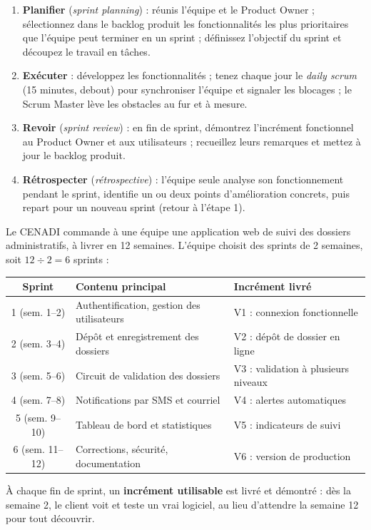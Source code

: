 \documentclass[11pt]{article}
\begin{document}
\begin{methode}
\begin{enumerate}
  \item \textbf{Planifier} (\emph{sprint planning}) : réunis l'équipe et le Product Owner ; sélectionnez dans le backlog produit les fonctionnalités les plus prioritaires que l'équipe peut terminer en un sprint ; définissez l'objectif du sprint et découpez le travail en tâches.
  \item \textbf{Exécuter} : développez les fonctionnalités ; tenez chaque jour le \emph{daily scrum} (15 minutes, debout) pour synchroniser l'équipe et signaler les blocages ; le Scrum Master lève les obstacles au fur et à mesure.
  \item \textbf{Revoir} (\emph{sprint review}) : en fin de sprint, démontrez l'incrément fonctionnel au Product Owner et aux utilisateurs ; recueillez leurs remarques et mettez à jour le backlog produit.
  \item \textbf{Rétrospecter} (\emph{rétrospective}) : l'équipe seule analyse son fonctionnement pendant le sprint, identifie un ou deux points d'amélioration concrets, puis repart pour un nouveau sprint (retour à l'étape 1).
\end{enumerate}
\end{methode}

\begin{exemplebox}
Le CENADI commande à une équipe une application web de suivi des dossiers administratifs, à livrer en 12 semaines. L'équipe choisit des sprints de 2 semaines, soit $12 \div 2 = 6$ sprints :
\begin{center}
\begin{tabularx}{\linewidth}{|c|X|l|}
\hline
\rowcolor{popblueL} \textbf{Sprint} & \textbf{Contenu principal} & \textbf{Incrément livré} \\
\hline
1 (sem. 1--2) & Authentification, gestion des utilisateurs & V1 : connexion fonctionnelle \\
\hline
2 (sem. 3--4) & Dépôt et enregistrement des dossiers & V2 : dépôt de dossier en ligne \\
\hline
3 (sem. 5--6) & Circuit de validation des dossiers & V3 : validation à plusieurs niveaux \\
\hline
4 (sem. 7--8) & Notifications par SMS et courriel & V4 : alertes automatiques \\
\hline
5 (sem. 9--10) & Tableau de bord et statistiques & V5 : indicateurs de suivi \\
\hline
6 (sem. 11--12) & Corrections, sécurité, documentation & V6 : version de production \\
\hline
\end{tabularx}
\end{center}
À chaque fin de sprint, un \textbf{incrément utilisable} est livré et démontré : dès la semaine 2, le client voit et teste un vrai logiciel, au lieu d'attendre la semaine 12 pour tout découvrir.
\end{exemplebox}
\end{document}
